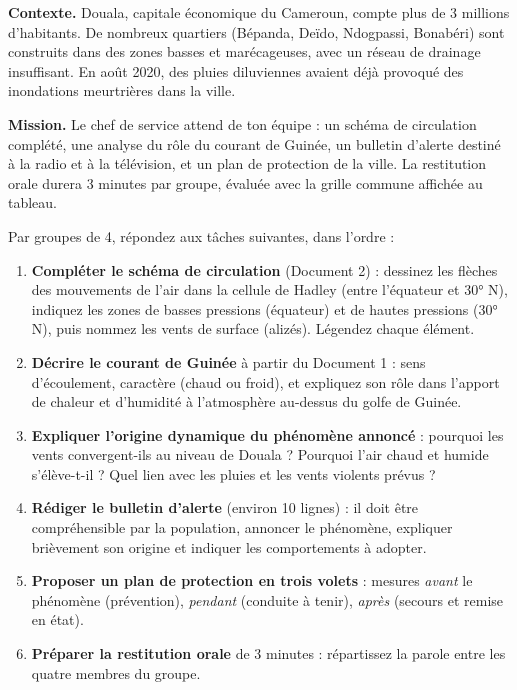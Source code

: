 \documentclass[11pt]{article}
\newcommand{\cle}[1]{{\popxbold\color{popdark}#1}}
\newcounter{popsec}
\newcounter{popsub}
\newcommand{\courssub}[1]{%
  \stepcounter{popsub}%
  \par\vspace{9pt}\noindent{\popxbold\fontsize{11.5}{13}\selectfont\color{popink}{\color{poporange}\thepopsec.\thepopsub}\hspace{6pt}#1}\par\nopagebreak\vspace{4pt}
}
\begin{document}
\textbf{Contexte.} Douala, capitale économique du Cameroun, compte plus de 3 millions d'habitants. De nombreux quartiers (Bépanda, Deïdo, Ndogpassi, Bonabéri) sont construits dans des zones basses et marécageuses, avec un réseau de drainage insuffisant. En août 2020, des pluies diluviennes avaient déjà provoqué des inondations meurtrières dans la ville.

\textbf{Mission.} Le chef de service attend de ton équipe : un schéma de circulation complété, une analyse du rôle du courant de Guinée, un \cle{bulletin d'alerte} destiné à la radio et à la télévision, et un \cle{plan de protection} de la ville. La restitution orale durera 3 minutes par groupe, évaluée avec la grille commune affichée au tableau.

\courssub{Consignes}

Par groupes de 4, répondez aux tâches suivantes, dans l'ordre :

\begin{enumerate}
\item \textbf{Compléter le schéma de circulation} (Document 2) : dessinez les flèches des mouvements de l'air dans la cellule de Hadley (entre l'équateur et 30° N), indiquez les zones de basses pressions (équateur) et de hautes pressions (30° N), puis nommez les vents de surface (alizés). Légendez chaque élément.
\item \textbf{Décrire le courant de Guinée} à partir du Document 1 : sens d'écoulement, caractère (chaud ou froid), et expliquez son rôle dans l'apport de \cle{chaleur} et d'\cle{humidité} à l'atmosphère au-dessus du golfe de Guinée.
\item \textbf{Expliquer l'origine dynamique du phénomène annoncé} : pourquoi les vents convergent-ils au niveau de Douala ? Pourquoi l'air chaud et humide s'élève-t-il ? Quel lien avec les pluies et les vents violents prévus ?
\item \textbf{Rédiger le bulletin d'alerte} (environ 10 lignes) : il doit être compréhensible par la population, annoncer le phénomène, expliquer brièvement son origine et indiquer les comportements à adopter.
\item \textbf{Proposer un plan de protection en trois volets} : mesures \emph{avant} le phénomène (prévention), \emph{pendant} (conduite à tenir), \emph{après} (secours et remise en état).
\item \textbf{Préparer la restitution orale} de 3 minutes : répartissez la parole entre les quatre membres du groupe.
\end{enumerate}
\end{document}

